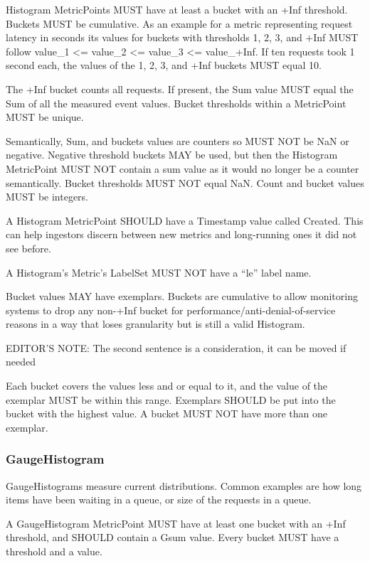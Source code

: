 \documentclass[a4paper,12pt,notitlepage,twoside,openright]{article}
\begin{document}
Histogram MetricPoints MUST have at least a bucket with an +Inf
threshold. Buckets MUST be cumulative. As an example for a metric
representing request latency in seconds its values for buckets with
thresholds 1, 2, 3, and +Inf MUST follow value\_1 \textless= value\_2
\textless= value\_3 \textless= value\_+Inf. If ten requests took 1
second each, the values of the 1, 2, 3, and +Inf buckets MUST equal 10.

The +Inf bucket counts all requests. If present, the Sum value MUST
equal the Sum of all the measured event values. Bucket thresholds within
a MetricPoint MUST be unique.

Semantically, Sum, and buckets values are counters so MUST NOT be NaN or
negative. Negative threshold buckets MAY be used, but then the Histogram
MetricPoint MUST NOT contain a sum value as it would no longer be a
counter semantically. Bucket thresholds MUST NOT equal NaN. Count and
bucket values MUST be integers.

A Histogram MetricPoint SHOULD have a Timestamp value called Created.
This can help ingestors discern between new metrics and long-running
ones it did not see before.

A Histogram's Metric's LabelSet MUST NOT have a ``le'' label name.

Bucket values MAY have exemplars. Buckets are cumulative to allow
monitoring systems to drop any non-+Inf bucket for
performance/anti-denial-of-service reasons in a way that loses
granularity but is still a valid Histogram.

EDITOR'S NOTE: The second sentence is a consideration, it can be moved
if needed

Each bucket covers the values less and or equal to it, and the value of
the exemplar MUST be within this range. Exemplars SHOULD be put into the
bucket with the highest value. A bucket MUST NOT have more than one
exemplar.

\hypertarget{gaugehistogram}{%
\subsubsection{GaugeHistogram}\label{gaugehistogram}}

GaugeHistograms measure current distributions. Common examples are how
long items have been waiting in a queue, or size of the requests in a
queue.

A GaugeHistogram MetricPoint MUST have at least one bucket with an +Inf
threshold, and SHOULD contain a Gsum value. Every bucket MUST have a
threshold and a value.
\end{document}
